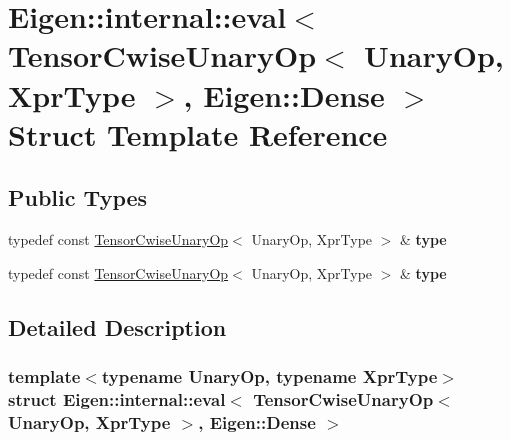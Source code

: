 \hypertarget{struct_eigen_1_1internal_1_1eval_3_01_tensor_cwise_unary_op_3_01_unary_op_00_01_xpr_type_01_4_00_01_eigen_1_1_dense_01_4}{}\section{Eigen\+:\+:internal\+:\+:eval$<$ Tensor\+Cwise\+Unary\+Op$<$ Unary\+Op, Xpr\+Type $>$, Eigen\+:\+:Dense $>$ Struct Template Reference}
\label{struct_eigen_1_1internal_1_1eval_3_01_tensor_cwise_unary_op_3_01_unary_op_00_01_xpr_type_01_4_00_01_eigen_1_1_dense_01_4}
\subsection*{Public Types}
\begin{DoxyCompactItemize}
\item 
\mbox{\label{struct_eigen_1_1internal_1_1eval_3_01_tensor_cwise_unary_op_3_01_unary_op_00_01_xpr_type_01_4_00_01_eigen_1_1_dense_01_4_ad2ba6e282c882d5bc684360dcec74eee}} 
typedef const \hyperlink{class_eigen_1_1_tensor_cwise_unary_op}{Tensor\+Cwise\+Unary\+Op}$<$ Unary\+Op, Xpr\+Type $>$ \& {\bfseries type}
\item 
\mbox{\label{struct_eigen_1_1internal_1_1eval_3_01_tensor_cwise_unary_op_3_01_unary_op_00_01_xpr_type_01_4_00_01_eigen_1_1_dense_01_4_ad2ba6e282c882d5bc684360dcec74eee}} 
typedef const \hyperlink{class_eigen_1_1_tensor_cwise_unary_op}{Tensor\+Cwise\+Unary\+Op}$<$ Unary\+Op, Xpr\+Type $>$ \& {\bfseries type}
\end{DoxyCompactItemize}


\subsection{Detailed Description}
\subsubsection*{template$<$typename Unary\+Op, typename Xpr\+Type$>$\newline
struct Eigen\+::internal\+::eval$<$ Tensor\+Cwise\+Unary\+Op$<$ Unary\+Op, Xpr\+Type $>$, Eigen\+::\+Dense $>$}




